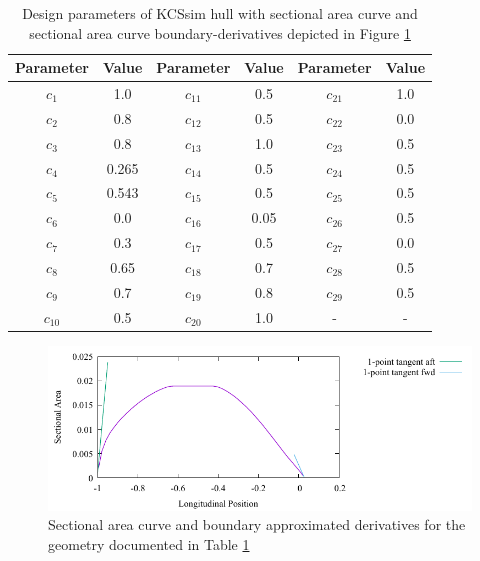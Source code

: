 \documentclass{report}
\begin{document}
\begin{table}[H]
    \centering
    \begin{tabular}{|c|c|c|c|c|c|}
        \hline 
        Parameter & Value & Parameter & Value & Parameter & Value\\
        \hline 
        $c_1$ & 1.0 & $c_{11}$ & 0.5 & $c_{21}$ & 1.0 \\
        \hline 
        $c_2$ & 0.8 & $c_{12}$ & 0.5 & $c_{22}$ & 0.0\\
        \hline 
        $c_3$ & 0.8 & $c_{13}$ & {\color{blue} 1.0} & $c_{23}$ & 0.5 \\
        \hline 
        $c_4$ & 0.265 & $c_{14}$ & 0.5 & $c_{24}$ & 0.5 \\
        \hline 
        $c_5$ & 0.543 & $c_{15}$ & 0.5 & $c_{25}$ & 0.5 \\
        \hline 
        $c_6$ & 0.0 & $c_{16}$ & 0.05 & $c_{26}$ & 0.5 \\
        \hline 
        $c_7$ & 0.3 & $c_{17}$ & 0.5 & $c_{27}$ & {\color{blue} 0.0} \\
        \hline 
        $c_8$ & 0.65 & $c_{18}$ & 0.7 & $c_{28}$ & 0.5 \\
        \hline 
        $c_9$ & 0.7 & $c_{19}$ & 0.8 & $c_{29}$ & 0.5 \\
        \hline 
        $c_{10}$ & 0.5 & $c_{20}$ & 1.0 & - & - \\
        \hline 
    \end{tabular}
    \caption{Design parameters of KCSsim hull with sectional area curve and 
    sectional area curve boundary-derivatives depicted in Figure
    \ref{fig:test-4-sac-10}}
    \label{tab:test-4-10}
\end{table}
\begin{figure}[H]
    \centering
    \includegraphics[width = 0.7\linewidth]{figures/test-4-sac-10.pdf}
    \caption{Sectional area curve and boundary approximated derivatives for
    the geometry documented in Table \ref{tab:test-4-10}}
    \label{fig:test-4-sac-10}
\end{figure}
\end{document}
